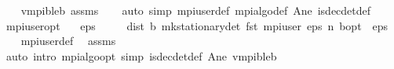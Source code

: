 \begin{isabellebody}
%
\isadelimproof
\ \ %
\endisadelimproof
%
\isatagproof
{}\isamarkupfalse%
\ v{}{\isacharunderscore}{\kern0pt}mpi\isactrlsub b{\isacharunderscore}{\kern0pt}le{\isacharunderscore}{\kern0pt}{\isasymL}\isactrlsub b\ assms\isanewline
\ \ \isamarkupfalse%
\ {\isacharparenleft}{\kern0pt}auto\ simp{\isacharcolon}{\kern0pt}\ mpi{\isacharunderscore}{\kern0pt}user{\isacharunderscore}{\kern0pt}def\ mpi{\isacharunderscore}{\kern0pt}algo{\isacharunderscore}{\kern0pt}def{\isacharprime}{\kern0pt}\ A{\isacharunderscore}{\kern0pt}ne\ is{\isacharunderscore}{\kern0pt}dec{\isacharunderscore}{\kern0pt}det{\isacharunderscore}{\kern0pt}def{\isacharparenright}{\kern0pt}%
\endisatagproof
{\isafoldproof}%
%
\isadelimproof
\isanewline
%
\endisadelimproof
\isanewline
{}\isamarkupfalse%
\ mpi{\isacharunderscore}{\kern0pt}user{\isacharunderscore}{\kern0pt}opt{\isacharcolon}{\kern0pt}\isanewline
\ \ \ {\isachardoublequoteopen}eps\ {\isachargreater}{\kern0pt}\ {}{\isachardoublequoteclose}\isanewline
\ \ \ {\isachardoublequoteopen}dist\ {\isacharparenleft}{\kern0pt}{\isasymnu}\isactrlsub b\ {\isacharparenleft}{\kern0pt}mk{\isacharunderscore}{\kern0pt}stationary{\isacharunderscore}{\kern0pt}det\ {\isacharparenleft}{\kern0pt}fst\ {\isacharparenleft}{\kern0pt}mpi{\isacharunderscore}{\kern0pt}user\ eps\ n{\isacharparenright}{\kern0pt}{\isacharparenright}{\kern0pt}{\isacharparenright}{\kern0pt}{\isacharparenright}{\kern0pt}\ {\isasymnu}\isactrlsub b{\isacharunderscore}{\kern0pt}opt\ {\isacharless}{\kern0pt}\ eps{\isachardoublequoteclose}\isanewline
%
\isadelimproof
\ \ %
\endisadelimproof
%
\isatagproof
{}\isamarkupfalse%
\ mpi{\isacharunderscore}{\kern0pt}user{\isacharunderscore}{\kern0pt}def\ \isamarkupfalse%
\ assms\isanewline
\ \ \isamarkupfalse%
\ {\isacharparenleft}{\kern0pt}auto\ intro{\isacharcolon}{\kern0pt}\ mpi{\isacharunderscore}{\kern0pt}algo{\isacharunderscore}{\kern0pt}opt\ simp{\isacharcolon}{\kern0pt}\ is{\isacharunderscore}{\kern0pt}dec{\isacharunderscore}{\kern0pt}det{\isacharunderscore}{\kern0pt}def\ A{\isacharunderscore}{\kern0pt}ne\ v{}{\isacharunderscore}{\kern0pt}mpi\isactrlsub b{\isacharunderscore}{\kern0pt}le{\isacharunderscore}{\kern0pt}{\isasymL}\isactrlsub b{\isacharparenright}{\kern0pt}%
\endisatagproof
{\isafoldproof}%
%
\isadelimproof
\isanewline
%
\endisadelimproof
\isanewline
{}\isamarkupfalse%
\isanewline
%
\isadelimtheory
\isanewline
%
\endisadelimtheory
%
\isatagtheory
{}\isamarkupfalse%
%
\endisatagtheory
{\isafoldtheory}%
%
\isadelimtheory
%
\endisadelimtheory
%
\end{isabellebody}%
